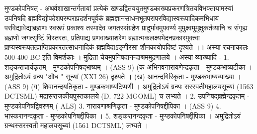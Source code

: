  
मुण्डकोपनिषत् -
अथर्वशाखान्तर्गतायां प्रत्येकं खण्डद्वितययुतमुण्डकाख्यप्रकरणत्रितयविभक्तायामस्यां उपनिषदि ब्रह्मविद्योपदेशपरम्पराप्रदर्शनपूर्वकं ब्रह्मज्ञानसाधनभूतपरापरविद्यास्वरूपादिकमभिधाय परविद्यावेद्याब्रह्मणः स्वरूपं प्रकाश्य तस्मादेव जगतस्संग्रहेण प्रादुर्भावमुपवर्ण्य मुमुक्ष्वमुमुक्षुकर्तव्यानि च संगृह्य ब्रह्मणो जगत्सृष्टिं विस्तरतः, प्रतिपाद्य प्रणवाख्याशरेण ब्रह्मात्मकलक्ष्यभेदनप्रकारमुक्त्वा प्राप्यस्वरूपतत्प्राप्तिप्रकारतत्साधनादिकं ब्रह्मविदाऽङ्गीरसा शौनकायोपदिष्टं दृश्यते ।। अस्या रचनाकालः 500-400 BC इति विमर्शकाः । मुद्रिता चेयमुपनिषदानन्दाश्रममुद्रणालये ।
अस्या व्याख्यादि - 
1. शङ्कराचार्यकृतम् - मुण्डकोपनिषद्भाष्यम् । (ASS 9) 
(क अभिनवनारायणेन्द्रकृता - मुण्डकभाष्यटीका । अमुद्रितोऽयं ग्रन्थ "औध " सूच्यां (XXI 26)  दृश्यते । 
(ख) आनन्दगिरिकृता - मुण्डकभाष्यव्याख्या । (ASS 9)
(ग) शिवानन्दयतिकृता - मुण्डकभाष्यटिप्पणी । 
अमुद्रितोऽयं ग्रन्थः सरस्वतीमहालयसूच्यां (1563 DCTSML) मद्रासराजकीयपुस्तकालये (D. 722 MGOML) च लभ्यते । 
2. उपनिषद्ब्रह्मेन्द्रकृतम् - मुण्डकोपनिषद्विवरणम् ( ALS)
3. नारायणाश्रणिकृता - मुण्डकोपनिषद्दीपिका । (ASS 9) 
4. भास्करानन्दकृता - मुण्डकोपनिषद्दीपिका ।
5. शङ्करानन्दकृता - मुण्डकोपनिषद्दीपिका । अमुद्रितोऽयं ग्रन्थस्सरस्वती महालयसूच्यां (1561 DCTSML) लभ्यते ।


